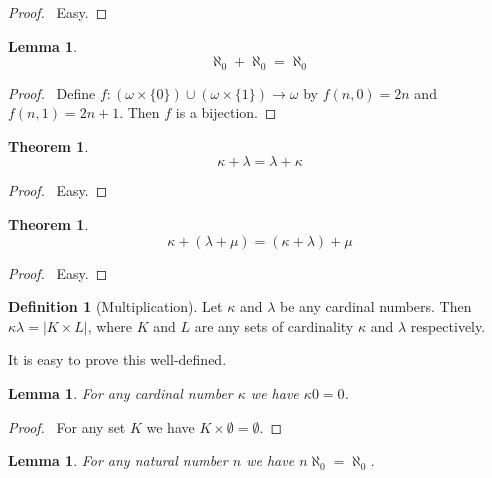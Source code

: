 \documentclass{report}
\let\qed\relax
\newtheorem{lemma}[axiom]{Lemma}
\newtheorem{theorem}[axiom]{Theorem}
\theoremstyle{definition}
\newtheorem{definition}[axiom]{Definition}
\begin{document}
    \begin{proof}
        \pf\ Easy. \qed
    \end{proof}

    \begin{lemma}
        \label{lemma:aleph0_plus_aleph0}
        \[ \aleph_0 + \aleph_0 = \aleph_0 \]
    \end{lemma}

    \begin{proof}
        \pf\ Define $f : (\omega \times \{ 0 \}) \cup (\omega \times \{1\}) \rightarrow \omega$ by
        $f(n,0) = 2n$ and $f(n,1) = 2n+1$. Then $f$ is a bijection. \qed
    \end{proof}

    \begin{theorem}
        \[ \kappa + \lambda = \lambda + \kappa \]
    \end{theorem}

    \begin{proof}
        \pf\ Easy. \qed
    \end{proof}

    \begin{theorem}
        \[ \kappa + (\lambda + \mu) = (\kappa + \lambda) + \mu \]
    \end{theorem}

    \begin{proof}
        \pf\ Easy. \qed
    \end{proof}

    \begin{definition}[Multiplication]
        Let $\kappa$ and $\lambda$ be any cardinal numbers. Then $\kappa \lambda = |K \times L|$,
        where $K$ and $L$ are any sets of cardinality $\kappa$ and $\lambda$ respectively.
    \end{definition}

    It is easy to prove this well-defined.

    \begin{lemma}
        For any cardinal number $\kappa$ we have $\kappa 0 = 0$.
    \end{lemma}

    \begin{proof}
        \pf\ For any set $K$ we have $K \times \emptyset = \emptyset$. \qed
    \end{proof}

    \begin{lemma}
        For any natural number $n$ we have $n \aleph_0 = \aleph_0$.
    \end{lemma}
\end{document}
